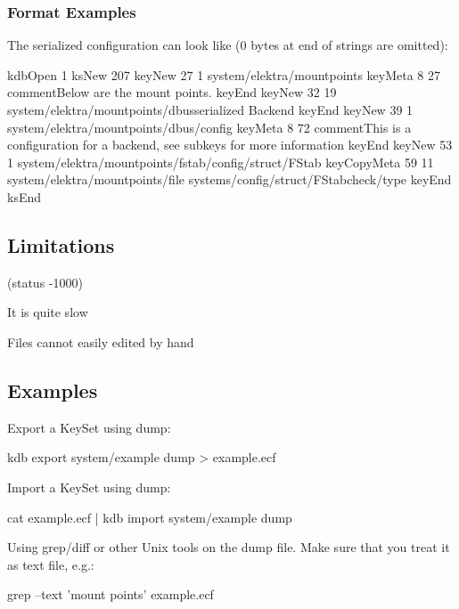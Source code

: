 \subsubsection*{Format Examples}

The serialized configuration can look like (0 bytes at end of strings are omitted)\+: \begin{DoxyVerb}kdbOpen 1
ksNew 207
keyNew 27 1
system/elektra/mountpoints
keyMeta 8 27
commentBelow are the mount points.
keyEnd
keyNew 32 19
system/elektra/mountpoints/dbusserialized Backend
keyEnd keyNew 39 1
system/elektra/mountpoints/dbus/config
keyMeta 8 72
commentThis is a configuration for a backend, see subkeys for more information
keyEnd
keyNew 53 1
system/elektra/mountpoints/fstab/config/struct/FStab
keyCopyMeta 59 11
system/elektra/mountpoints/file
systems/config/struct/FStabcheck/type
keyEnd
ksEnd
\end{DoxyVerb}


\subsection*{Limitations}

(status -\/1000)


\begin{DoxyItemize}
\item It is quite slow
\item Files cannot easily edited by hand
\end{DoxyItemize}

\subsection*{Examples}

Export a Key\+Set using {\ttfamily dump}\+: \begin{DoxyVerb}kdb export system/example dump > example.ecf
\end{DoxyVerb}


Import a Key\+Set using {\ttfamily dump}\+: \begin{DoxyVerb}cat example.ecf | kdb import system/example dump
\end{DoxyVerb}


Using grep/diff or other Unix tools on the dump file. Make sure that you treat it as text file, e.\+g.\+: \begin{DoxyVerb}grep --text 'mount points' example.ecf\end{DoxyVerb}
 